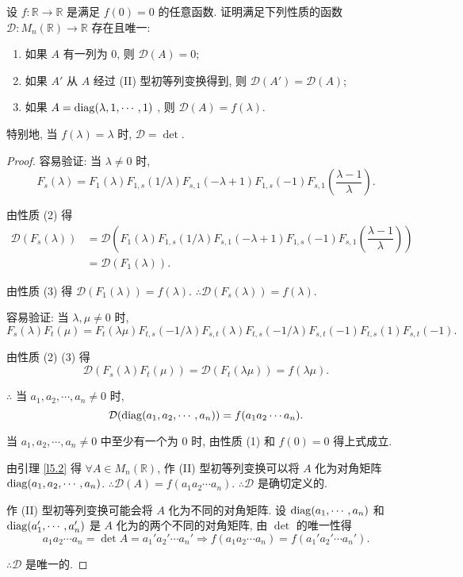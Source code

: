 \documentclass[color=black,device=normal,lang=cn,mode=geye]{elegantnote}
\begin{document}
\begin{exercise}\label{ex4.1}
    设 $f:\mathbb{R}\to\mathbb{R}$ 是满足 $f(0)=0$ 的任意函数. 证明满足下列性质的函数 $\mathcal{D}:M_n(\mathbb{R})\to\mathbb{R}$ 存在且唯一:
    \begin{enumerate}
        \item 如果 $A$ 有一列为 $0$, 则 $\mathcal{D}(A)=0$;
        \item 如果 $A'$ 从 $A$ 经过 (II) 型初等列变换得到, 则 $\mathcal{D}(A')=\mathcal{D}(A)$;
        \item 如果 $A=\operatorname{diag}(\lambda,1,\cdots,1)$ , 则 $\mathcal{D}(A)=f(\lambda)$.
    \end{enumerate}

    特别地, 当 $f(\lambda)=\lambda$ 时, $\mathcal{D}=\det$.
\end{exercise}
\begin{proof}
    容易验证: 当 $\lambda\neq0$ 时,
    \[F_s(\lambda)=F_1(\lambda)F_{1,s}(1/\lambda)F_{s,1}(-\lambda+1)F_{1,s}(-1)F_{s,1}\left(\dfrac{\lambda-1}{\lambda}\right).\]

    由性质 (2) 得
    \begin{align*}
        \mathcal{D}(F_s(\lambda)) & =\mathcal{D}\left(F_1(\lambda)F_{1,s}(1/\lambda)F_{s,1}(-\lambda+1)F_{1,s}(-1)F_{s,1}\left(\dfrac{\lambda-1}{\lambda}\right)\right) \\
        & =\mathcal{D}(F_1(\lambda)).
    \end{align*}

    由性质 (3) 得 $\mathcal{D}(F_1(\lambda))=f(\lambda)$. $\therefore\mathcal{D}(F_s(\lambda))=f(\lambda)$.

    容易验证: 当 $\lambda,\mu\neq0$ 时,
    \[F_s(\lambda)F_t(\mu)=F_t(\lambda\mu)F_{t,s}(-1/\lambda)F_{s,t}(\lambda)F_{t,s}(-1/\lambda)F_{s,t}(-1)F_{t,s}(1)F_{s,t}(-1).\]

    由性质 (2) (3) 得
    \[\mathcal{D}(F_s(\lambda)F_t(\mu))=\mathcal{D}(F_t(\lambda\mu))=f(\lambda\mu).\]
    
    $\therefore$ 当 $a_1,a_2,\cdots,a_n\neq0$ 时,
    \[\mathcal{D}(\operatorname{diag}(a_1,a_2,\cdots,a_n))=f(a_1a_2\cdots a_n).\]

    当 $a_1,a_2,\cdots,a_n\neq0$ 中至少有一个为 $0$ 时, 由性质 (1) 和 $f(0)=0$ 得上式成立.

    由引理 \ref{l5.2} 得 $\forall A\in M_n(\mathbb{R})$, 作 (II) 型初等列变换可以将 $A$ 化为对角矩阵 $\operatorname{diag}(a_1,a_2,\cdots,a_n)$. $\therefore\mathcal{D}(A)=f(a_1a_2\cdots a_n)$. $\therefore\mathcal{D}$ 是确切定义的.

    作 (II) 型初等列变换可能会将 $A$ 化为不同的对角矩阵. 设 $\operatorname{diag}(a_1,\cdots,a_n)$ 和 $\operatorname{diag}(a_1',\cdots,a_n')$ 是 $A$ 化为的两个不同的对角矩阵, 由 $\det$ 的唯一性得
    \[a_1a_2\cdots a_n=\det A=a_1'a_2'\cdots a_n'\Rightarrow f(a_1a_2\cdots a_n)=f(a_1'a_2'\cdots a_n').\]

    $\therefore\mathcal{D}$ 是唯一的.
\end{proof}
\end{document}
